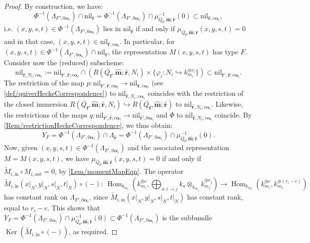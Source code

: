 \documentclass[a4paper,12pt]{article}
\theoremstyle{definition}
\theoremstyle{plain}
\theoremstyle{remark}
\DeclareMathOperator{\Ker}{Ker}
\DeclareMathOperator{\Hom}{Hom}
\newcommand\bfalpha{\bm{\alpha}}
\newcommand\bff{\mathbf{f}}
\newcommand\bfm{\mathbf{m}}
\newcommand\bfr{\mathbf{r}}
\begin{document}
\begin{proof}
By construction, we have:
\[
\Phi^{-1}(\Lambda_{F',0\bfalpha_i})\cap \mathrm{nil}_{\widehat{\bfr}}
=
\Phi^{-1}(\Lambda_{F',0\bfalpha_i})\cap\mu_{\overline{Q_\bff},\widehat{\bfm};\widehat{\bfr}}^{-1}(0)
\subset
\mathrm{nil}_{\widehat{\bfr},c\bfalpha_i}
,
\]
i.e. $(x,y,s,t)\in\Phi^{-1}(\Lambda_{F',0\bfalpha_i})$ lies in $\mathrm{nil}_{\widehat{\bfr}}$ if and only if $\mu_{\overline{Q_\bff},\widehat{\bfm};\widehat{\bfr}}(x,y,s,t)=0$ and in that case, $(x,y,s,t)\in\mathrm{nil}_{\widehat{\bfr},c\bfalpha_i}$. In particular, for $(x,y,s,t)\in\Phi^{-1}(\Lambda_{F',0\bfalpha_i})\cap\mathrm{nil}_{\widehat{\bfr}}$, the representation $M(x,y,s,t)$ has type $F$. Consider now the (reduced) subscheme:
\[
\mathrm{nil}_{\widehat{\bfr},N_i;c\bfalpha_i}
:=
\mathrm{nil}_{\widehat{\bfr}',\widehat{\bfr};c\bfalpha_i}
\cap
\left(
R(\overline{Q_\bff},\widehat{\bfm};\widehat{\bfr},N_i)\times\{\varphi_i:N_i\hookrightarrow k_{m_i}^{\oplus r_i}\}
\right)
\subset
\mathrm{nil}_{\widehat{\bfr}',\widehat{\bfr};c\bfalpha_i}
.
\]
The restriction of the map $p\colon \mathrm{nil}_{\widehat{\bfr}',\widehat{\bfr};c\bfalpha_i}\rightarrow\mathrm{nil}_{\widehat{\bfr},c\bfalpha_i}$ (see \cref{def/quiverHeckeCorrespondence}) to $\mathrm{nil}_{\widehat{\bfr},N_i;c\bfalpha_i}$ coincides with the restriction of the closed immersion $R(\overline{Q_\bff},\widehat{\bfm};\widehat{\bfr},N_i)\hookrightarrow R(\overline{Q_\bff},\widehat{\bfm};\widehat{\bfr})$ to $\mathrm{nil}_{\widehat{\bfr},N_i;c\bfalpha_i}$. Likewise, the restrictions of the maps $q \colon\mathrm{nil}_{\widehat{\bfr}',\widehat{\bfr};c\bfalpha_i}\rightarrow\mathrm{nil}_{\widehat{\bfr}',0\bfalpha_i}$ and $\Phi$ to $\mathrm{nil}_{\widehat{\bfr},N_i;c\bfalpha_i}$ coincide. By \cref{Rem/restrictionHeckeCorrespondence}, we thus obtain:
\[
Y_F
=
\Phi^{-1}(\Lambda_{F',0\bfalpha_i})\cap\Lambda_{\widehat{\bfr}}
=
\Phi^{-1}(\Lambda_{F',0\bfalpha_i})\cap\mu_{\overline{Q_\bff},\widehat{\bfm};\widehat{\bfr}}^{-1}(0).
\]
Now, given $(x,y,s,t)\in\Phi^{-1}(\Lambda_{F',0\bfalpha_i})$ and the associated representation $M=M(x,y,s,t)$, we have $\mu_{\overline{Q_\bff},\widehat{\bfm};\widehat{\bfr}}(x,y,s,t)=0$ if and only if $\widetilde{M}_{i,\mathrm{in}}\circ M_{i,\mathrm{out}}=0$, by \cref{Lem/momentMapEqn}. The operator
\[
\widetilde{M}_{i,\mathrm{in}}(x\vert_N,y\vert_N,s\vert_N,t\vert_N)\circ (-)\colon \! \ \Hom_{k_{m_i}}\!\!\left(k_{m_i}^{\oplus c},\bigoplus_{a:i\rightarrow j}k_a\otimes_{k_{m_j}}k_{m_j}^{\oplus r_j} \!\right)
\rightarrow
\Hom_{k_{m_i}}(k_{m_i}^{\oplus c},k_{m_i}^{\oplus (r_i-c)})
\]
has constant rank on $\Lambda_{F',0\bfalpha_i}$, since $\widetilde{M}_{i,\mathrm{in}}(x\vert_N,y\vert_N,s\vert_N,t\vert_N)$ has constant rank, equal to $r_i-c$. This shows that $Y_F=\Phi^{-1}(\Lambda_{F',0\bfalpha_i})\cap\mu_{\overline{Q_\bff},\widehat{\bfm};\widehat{\bfr}}^{-1}(0)\subset\Phi^{-1}(\Lambda_{F',0\bfalpha_i})$ is the subbundle $\Ker(\widetilde{M}_{i,\mathrm{in}}\circ (-))$, as required.
\end{proof}
\end{document}
